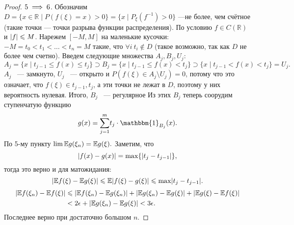\begin{proof}
     $5\implies 6$. Обозначим $D = \{x\in\mathbb{R}\mid P(f(\xi) = x) > 0\} = \{x\mid P_\xi(f^{-1}) > 0\}$ ---не более, чем счётное (такие точки --- точки разрыва функции распределения).
    По условию $f\in C(\mathbb{R})$ и $\lvert f\rvert\leqslant M$. Нарежем $[-M, M]$ на маленькие кусочки: $-M = t_0 < t_1 < \ldots < t_n = M$ такие, что $\forall i \ t_i \notin D$ (такое возможно, так как $D$ не более чем счетно).
     Введем следующие множества $A_j, B_j, U_j$:
     $$A_j = \{x\mid t_{j - 1}\le f(x) \le t_j\}\supset B_j = \{x\mid t_{j - 1}\le f(x) < t_j\} \supset \{x\mid t_{j - 1}< f(x) < t_j\} =  U _j.$$
     $A_j$ ~--- замкнуто, $ U _j$ ~--- открыто и $P(f(\xi)\in A_j\setminus  U _j) = 0$, потому что это означает, что $f(\xi)\in {t_{j - 1}, t_j}$, а эти точки не лежат в $D$, поэтому у них вероятность нулевая. Итого, $B_j$ ~--- регулярное
     Из этих $B_j$ теперь соорудим ступенчатую функцию 
     $$g(x)= \overset{m}{\underset{j = 1}{\sum}} t_j\cdot\mathbbm{1}_{B_j}(x).$$
    По 5-му пункту $\lim \mathbb{E} g(\xi_n) = \mathbb{E} g(\xi).$
    Заметим, что
       $$ \lvert f(x) - g(x)\rvert = \max\{\lvert t_j - t_{j - 1}\rvert\}, $$
       тогда это верно и для матожидания:
       $$\lvert\mathbb{E} f(\xi) - \mathbb{E} g(\xi)\rvert\leqslant \mathbb{E} \lvert f(\xi) - g(\xi)\rvert\leqslant \max \lvert t_j - t_{j - 1}\rvert.$$
        \begin{align*}
        \lvert\mathbb{E} f(\xi_n) - \mathbb{E} f(\xi)\rvert &\leqslant \lvert\mathbb{E} f(\xi_n) - \mathbb{E} g(\xi_n)\rvert + \lvert\mathbb{E} g(\xi_n) - \mathbb{E} g(\xi)\rvert + \lvert\mathbb{E} g(\xi) - \mathbb{E} f(\xi)\rvert \\&< 2 \epsilon + \lvert\mathbb{E} g(\xi_n) - \mathbb{E} g(\xi)\rvert < 3 \epsilon.
    \end{align*}
     Последнее верно при достаточно большом $n$. 
 \end{proof}